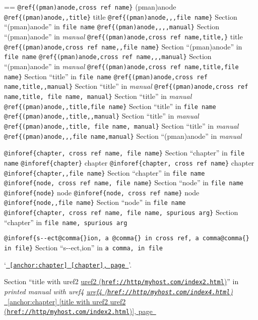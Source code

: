 \documentclass{book}
\makeatletter
\newenvironment{GNUTexinfopreformatted}{%
  \par\obeylines\obeyspaces\frenchspacing
  \parskip=\z@\parindent=\z@}{}
\makeatother
\begin{document}
\begin{GNUTexinfopreformatted}
\texttt{@ref\{(pman)anode,cross ref name\}} (pman)anode
\texttt{@ref\{(pman)anode{,}{,}title\}} title
\texttt{@ref\{(pman)anode{,}{,},file name\}} Section ``(pman)anode'' in \texttt{file name}
\texttt{@ref\{(pman)anode{,}{,}{,}{,}manual\}} Section ``(pman)anode'' in \textsl{manual}
\texttt{@ref\{(pman)anode,cross ref name,title,\}} title
\texttt{@ref\{(pman)anode,cross ref name{,}{,}file name\}} Section ``(pman)anode'' in \texttt{file name}
\texttt{@ref\{(pman)anode,cross ref name{,}{,},manual\}} Section ``(pman)anode'' in \textsl{manual}
\texttt{@ref\{(pman)anode,cross ref name,title,file name\}} Section ``title'' in \texttt{file name}
\texttt{@ref\{(pman)anode,cross ref name,title{,}{,}manual\}} Section ``title'' in \textsl{manual}
\texttt{@ref\{(pman)anode,cross ref name,title,\ file name,\ manual\}} Section ``title'' in \textsl{manual}
\texttt{@ref\{(pman)anode{,}{,}title,file name\}} Section ``title'' in \texttt{file name}
\texttt{@ref\{(pman)anode{,}{,}title{,}{,}manual\}} Section ``title'' in \textsl{manual}
\texttt{@ref\{(pman)anode{,}{,}title,\ file name,\ manual\}} Section ``title'' in \textsl{manual}
\texttt{@ref\{(pman)anode{,}{,},file name,manual\}} Section ``(pman)anode'' in \textsl{manual}


\texttt{@inforef\{chapter,\ cross ref name,\ file name\}} Section ``chapter'' in \texttt{file name}
\texttt{@inforef\{chapter\}} chapter
\texttt{@inforef\{chapter,\ cross ref name\}} chapter
\texttt{@inforef\{chapter{,}{,}file name\}} Section ``chapter'' in \texttt{file name}
\texttt{@inforef\{node,\ cross ref name,\ file name\}} Section ``node'' in \texttt{file name}
\texttt{@inforef\{node\}} node
\texttt{@inforef\{node,\ cross ref name\}} node
\texttt{@inforef\{node{,}{,}file name\}} Section ``node'' in \texttt{file name}
\texttt{@inforef\{chapter,\ cross ref name,\ file name,\ spurious arg\}} Section ``chapter'' in \texttt{file name,\ spurious arg}

\texttt{@inforef\{s{-}{-}ect@comma\{\}ion,\ a @comma\{\} in cross
ref,\ a comma@comma\{\} in file\}}
Section ``s{-}{-}ect,ion'' in \texttt{a comma, in file}

`\texttt{\hyperref[anchor:chapter]{\chaptername~\ref*{anchor:chapter} [chapter], page~\pageref*{anchor:chapter}}}'.

Section ``title with uref2 \href{href://http/myhost.com/index2.html}{uref2 (\nolinkurl{href://http/myhost.com/index2.html})}'' in \textsl{printed manual with uref4 \href{href://http/myhost.com/index4.html}{uref4 (\nolinkurl{href://http/myhost.com/index4.html})}}
\hyperref[anchor:chapter]{\chaptername~\ref*{anchor:chapter} [title with uref2 \href{href://http/myhost.com/index2.html}{uref2 (\nolinkurl{href://http/myhost.com/index2.html})}], page~\pageref*{anchor:chapter}}

\end{GNUTexinfopreformatted}
\end{document}
